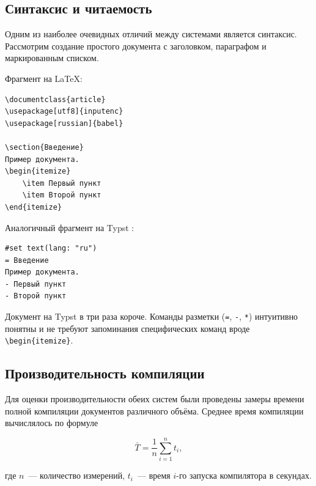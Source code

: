 \subsection{Синтаксис и читаемость}

Одним из наиболее очевидных отличий между системами является синтаксис. Рассмотрим создание простого документа с заголовком, параграфом и маркированным списком.

Фрагмент на {\LaTeX}:
\begin{verbatim}
\documentclass{article}
\usepackage[utf8]{inputenc}
\usepackage[russian]{babel}

\section{Введение}
Пример документа.
\begin{itemize}
    \item Первый пункт
    \item Второй пункт
\end{itemize}

\end{verbatim}

Аналогичный фрагмент на Typst \cite{typst-docs}:

\begin{verbatim}
#set text(lang: "ru")
= Введение
Пример документа.
- Первый пункт
- Второй пункт
\end{verbatim}

Документ на Typst в три раза короче. Команды разметки (\texttt{=}, \texttt{-}, \texttt{*}) интуитивно понятны и не требуют запоминания специфических команд вроде \verb|\begin{itemize}|.

\subsection{Производительность компиляции}

Для оценки производительности обеих систем были проведены замеры времени полной компиляции документов различного объёма. Среднее время компиляции вычислялось по формуле

\begin{equation}
    \label{eq:mean_time}
    \bar{T} = \frac{1}{n} \sum_{i=1}^{n} t_i,
\end{equation}

\noindent где $n$~--- количество измерений, $t_i$~--- время $i$-го запуска компилятора в секундах.

